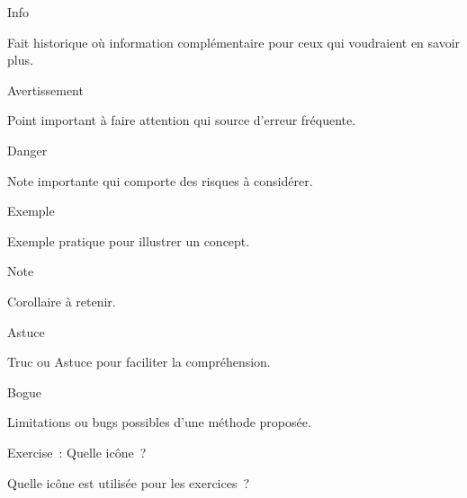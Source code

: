 \documentclass[11pt,a4paper,twoside]{book}
\begin{document}
\begin{callout}{Info}


Fait historique où information complémentaire pour ceux qui voudraient en savoir plus.


\end{callout}
\begin{callout}{Avertissement}


Point important à faire attention qui source d'erreur fréquente.


\end{callout}
\begin{callout}{Danger}


Note importante qui comporte des risques à considérer.


\end{callout}
\begin{callout}{Exemple}


Exemple pratique pour illustrer un concept.


\end{callout}
\begin{callout}{Note}


Corollaire à retenir.


\end{callout}
\begin{callout}{Astuce}


Truc ou Astuce pour faciliter la compréhension.


\end{callout}
\begin{callout}{Bogue}


Limitations ou bugs possibles d'une méthode proposée.


\end{callout}
\begin{callout}{Exercise~: Quelle icône~?}


Quelle icône est utilisée pour les exercices~?


\end{callout}
\end{document}
